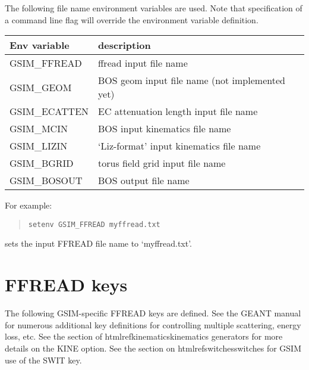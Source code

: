 \documentclass{article}
\begin{document}
\par
The following file name environment variables are used.  Note that
specification of a command line flag will override the environment
variable definition.
\par
\begin{center}
\begin{tabular}{|l|l|} \hline
Env variable  &  description \\ \hline
GSIM\_FFREAD  &  ffread input file name \\
GSIM\_GEOM    &  BOS geom input file name (not implemented yet) \\
GSIM\_ECATTEN &  EC attenuation length input file name \\
GSIM\_MCIN    &  BOS input kinematics file name \\
GSIM\_LIZIN   &  `Liz-format' input kinematics file name   \\
GSIM\_BGRID   &  torus field grid input file name      \\
GSIM\_BOSOUT  &  BOS output file name \\ \hline
\end{tabular}
\end{center}

\noindent
For example:
\begin{quote}
{\tt setenv GSIM\_FFREAD myffread.txt}
\end{quote}
sets the input FFREAD file name to `myffread.txt'.


\newpage
\section{FFREAD keys}
\label{ffread}

The following GSIM-specific FFREAD keys are defined.  See the GEANT
manual for numerous additional key definitions for controlling multiple
scattering, energy loss, etc.  See the section of
htmlref{kinematics}{kinematics} generators for more details on the
KINE option.  See the section on
htmlref{switches}{switches} for GSIM use of the SWIT key.
\end{document}

